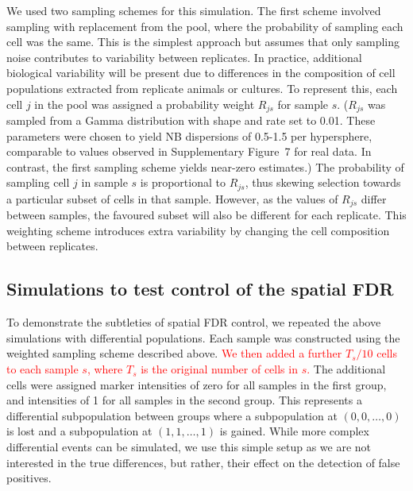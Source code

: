 \documentclass{article}
\newcommand\revised[1]{\textcolor{red}{#1}}
\newcommand{\suppfignbdisp}{7}
\begin{document}
We used two sampling schemes for this simulation.
The first scheme involved sampling with replacement from the pool, where the probability of sampling each cell was the same.
This is the simplest approach but assumes that only sampling noise contributes to variability between replicates.
In practice, additional biological variability will be present due to differences in the composition of cell populations extracted from replicate animals or cultures.
To represent this, each cell $j$ in the pool was assigned a probability weight $R_{js}$ for sample $s$.
($R_{js}$ was sampled from a Gamma distribution with shape and rate set to 0.01.
These parameters were chosen to yield NB dispersions of 0.5-1.5 per hypersphere, comparable to values observed in Supplementary Figure~\suppfignbdisp{} for real data.
In contrast, the first sampling scheme yields near-zero estimates.)
The probability of sampling cell $j$ in sample $s$ is proportional to $R_{js}$, thus skewing selection towards a particular subset of cells in that sample.
However, as the values of $R_{js}$ differ between samples, the favoured subset will also be different for each replicate.
This weighting scheme introduces extra variability by changing the cell composition between replicates.

\subsection{Simulations to test control of the spatial FDR}
To demonstrate the subtleties of spatial FDR control, we repeated the above simulations with differential populations.
Each sample was constructed using the weighted sampling scheme described above.
\revised{We then added a further $T_s/10$ cells to each sample $s$, where $T_s$ is the original number of cells in $s$.}
The additional cells were assigned marker intensities of zero for all samples in the first group, and intensities of 1 for all samples in the second group.
This represents a differential subpopulation between groups where a subpopulation at $(0,0, \ldots, 0)$ is lost and a subpopulation at $(1, 1, \ldots, 1)$ is gained.
While more complex differential events can be simulated, we use this simple setup as we are not interested in the true differences, but rather, their effect on the detection of false positives.
\end{document}
